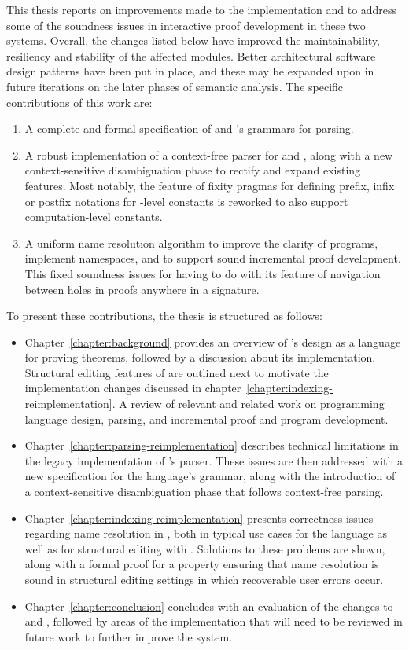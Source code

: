 This thesis reports on improvements made to the implementation \Beluga and \Harpoon to address some of the soundness issues in interactive proof development in these two systems.
Overall, the changes listed below have improved the maintainability, resiliency and stability of the affected modules.
Better architectural software design patterns have been put in place, and these may be expanded upon in future iterations on the later phases of semantic analysis.
The specific contributions of this work are:
\begin{enumerate}
\item
A complete and formal specification of \Beluga and \Harpoon's grammars for parsing.
\item
A robust implementation of a context-free parser for \Beluga and \Harpoon, along with a new context-sensitive disambiguation phase to rectify and expand existing features.
Most notably, the \Beluga feature of fixity pragmas for defining prefix, infix or postfix notations for \LF-level constants is reworked to also support computation-level constants.
\item
A uniform name resolution algorithm to improve the clarity of \Beluga programs, implement namespaces, and to support sound incremental proof development.
This fixed soundness issues for \Harpoon having to do with its feature of navigation between holes in proofs anywhere in a \Beluga signature.
\end{enumerate}
To present these contributions, the thesis is structured as follows:
\begin{itemize}
\item
Chapter~\ref{chapter:background} provides an overview of \Beluga's design as a language for proving theorems, followed by a discussion about its implementation.
Structural editing features of \Harpoon are outlined next to motivate the implementation changes discussed in chapter~\ref{chapter:indexing-reimplementation}.
A review of relevant and related work on programming language design, parsing, and incremental proof and program development.
\item
Chapter~\ref{chapter:parsing-reimplementation} describes technical limitations in the legacy  implementation of \Beluga's parser.
These issues are then addressed with a new specification for the language's grammar, along with the introduction of a context-sensitive disambiguation phase that follows context-free parsing.
\item
Chapter~\ref{chapter:indexing-reimplementation} presents correctness issues regarding name resolution in \Beluga, both in typical use cases for the language as well as for structural editing with \Harpoon.
Solutions to these problems are shown, along with a formal proof for a property ensuring that name resolution is sound in structural editing settings in which recoverable user errors occur.
\item
Chapter~\ref{chapter:conclusion} concludes with an evaluation of the changes to \Beluga and \Harpoon, followed by areas of the implementation that will need to be reviewed in future work to further improve the system.
\end{itemize}
